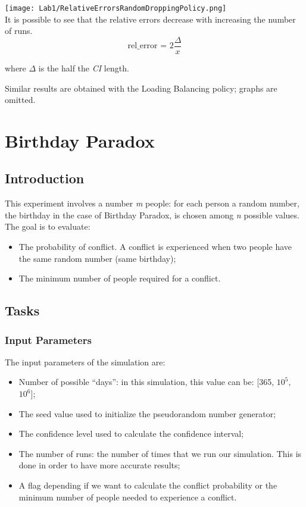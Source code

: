 \documentclass[twocolumn,letterpaper]{report}
\begin{document}
{			\texttt{[image: Lab1/RelativeErrorsRandomDroppingPolicy.png]} \\
			It is possible to see that the relative errors decrease with increasing the number of runs. 
			\begin{equation}\label{eq:3}
				 \text{rel\_error = }2\frac{\Delta}{x}
			\end{equation}
			\begin{center}
					where $\Delta$ is the half the \emph{CI} length.
			\end{center}
			Similar results are obtained with the Loading Balancing policy; graphs are omitted.
					
			
\chapter{Birthday Paradox}
	 
	 \section{Introduction}
	 
	This experiment involves a number \emph{m} people: for each person a random number, the birthday in the case of Birthday Paradox, is chosen among \emph{n} possible values. \\
	The goal is to evaluate:
	\begin{itemize}
		\item The probability of conflict. A conflict is experienced when two people have the same random number (same birthday);
		\item The minimum number of people required for a conflict.
	\end{itemize}

	\section{Tasks}
	 
		\subsection{Input Parameters}
			The input parameters of the simulation are:
			\begin{itemize}
				\item Number of possible ``days'': in this simulation, this value can be: [365, $10^5$, $10^6$];
				\item The seed value used to initialize the pseudorandom number generator;
				\item The confidence level used to calculate the confidence interval;
				\item The number of runs: the number of times that we run our simulation. This is done in order to have more accurate results;
				\item A flag depending if we want to calculate the conflict probability or the minimum number of people needed to experience a conflict.
			\end{itemize}
			 
}
\end{document}
